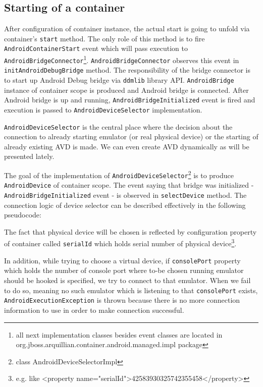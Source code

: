 \documentclass[12pt,final,oneside]{fithesis}
\begin{document}
		\subsection{Starting of a container}

After configuration of container instance, the actual start is going to unfold via container's \texttt{start} method. The only role of this method is to fire \texttt{AndroidContainerStart} event which will pass execution to \texttt{AndroidBridgeConnector}\footnote{all next implementation classes besides event classes are located in org.jboss.arquillian.container.android.managed.impl package}. \texttt{AndroidBridgeConnector} observes this event in \texttt{initAndroidDebugBridge} method. The responsibility of the bridge connector is to start up Android Debug bridge via \texttt{ddmlib} library API. \texttt{AndroidBridge} instance of container scope is produced and Android bridge is connected. After Android bridge is up and running, \texttt{AndroidBridgeInitialized} event is fired and execution is passed to \texttt{AndroidDeviceSelector} implementation.

\texttt{AndroidDeviceSelector} is the central place where the decision about the connection to already starting emulator (or real physical device) or the starting of already existing AVD is made. We can even create AVD dynamically as will be presented lately.

The goal of the implementation of \texttt{AndroidDeviceSelector}\footnote{class AndroidDeviceSelectorImpl} is to produce \texttt{AndroidDevice} of container scope. The event saying that bridge was initialized - \texttt{AndroidBridgeInitialized} event - is observed in \texttt{selectDevice} method. The connection logic of device selector can be described effectively in the following pseudocode:



The fact that physical device will be chosen is reflected by configuration property of container called \texttt{serialId} which holds serial number of physical device\footnote{e.g. like <property name="serialId">42583930325742355458</property>}.

In addition, while trying to choose a virtual device, if \texttt{consolePort} property which holds the number of console port where to-be chosen running emulator should be hooked is specified, we try to connect to that emulator. When we fail to do so, meaning no such emulator which is listening to that \texttt{consolePort} exists, \texttt{AndroidExecutionException} is thrown because there is no more connection information to use in order to make connection successful. 
\end{document}
